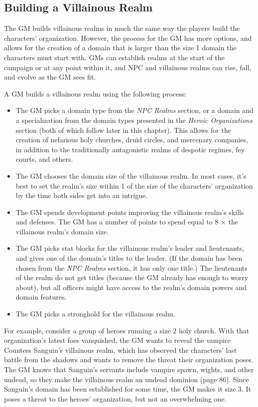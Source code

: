 \documentclass[10pt,a4paper,twoside,bg=print,twocolumn,openany,nodeprecatedcode]{dndbook}
\begin{document}
\subsection{Building a Villainous Realm}
The GM builds villainous realms in much the same way the players build the characters' organization. However, the process for the GM has more options, and allows for the creation of a domain that is larger than the size 1 domain the characters must start with. GMs can establish realms at the start of the campaign or at any point within it, and NPC and villainous realms can rise, fall, and evolve as the GM sees fit.

A GM builds a villainous realm using the following process:


\begin{itemize}
\item The GM picks a domain type from the \textit{NPC Realms} section, or a domain and a specialization from the domain types presented in the \textit{Heroic Organizations} section (both of which follow later in this chapter). This allows for the creation of nefarious holy churches, druid circles, and mercenary companies, in addition to the traditionally antagonistic realms of despotic regimes, fey courts, and others.
\item The GM chooses the domain size of the villainous realm. In most cases, it's best to set the realm's size within 1 of the size of the characters' organization by the time both sides get into an intrigue.
\item The GM spends development points improving the villainous realm's skills and defenses. The GM has a number of points to spend equal to 8 × the villainous realm's domain size.
\item The GM picks stat blocks for the villainous realm's leader and lieutenants, and gives one of the domain's titles to the leader. (If the domain has been chosen from the \textit{NPC Realms} section, it has only one title.) The lieutenants of the realm do not get titles (because the GM already has enough to worry about), but all officers might have access to the realm's domain powers and domain features.
\item The GM picks a stronghold for the villainous realm.
\end{itemize}

For example, consider a group of heroes running a size 2 holy church. With that organization's latest foes vanquished, the GM wants to reveal the vampire Countess Sanguin's villainous realm, which has observed the characters' last battle from the shadows and wants to remove the threat their organization poses. The GM knows that Sanguin's servants include vampire spawn, wights, and other undead, so they make the villainous realm an undead dominion (page 86). Since Sanguin's domain has been established for some time, the GM makes it size 3. It poses a threat to the heroes' organization, but not an overwhelming one.
\end{document}
